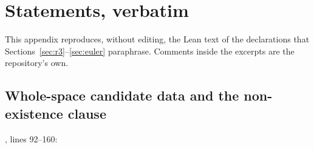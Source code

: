 \section{Statements, verbatim}
\label{app:statements}

This appendix reproduces, without editing, the Lean text of the declarations that
Sections~\ref{sec:r3}--\ref{sec:euler} paraphrase. Comments inside the excerpts are the
repository's own.

\subsection*{Whole-space candidate data and the non-existence clause}

\noindent{}, lines 92--160:

